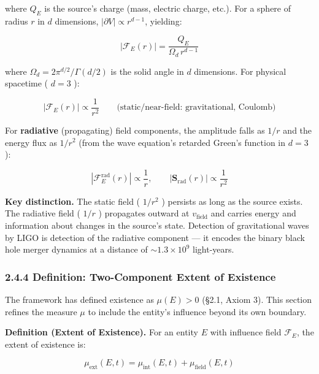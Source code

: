 \documentclass[11pt,a4paper]{article}
\theoremstyle{definition}\newtheorem{definition}{Definition}
\theoremstyle{remark}\newtheorem{remark}{Remark}
\begin{document}
where $Q_E$ is the source's charge (mass, electric charge, etc.). For a sphere of radius $r$ in $d$ dimensions, $|\partial V| \propto r^{d-1}$, yielding:


\begin{equation}
\boxed{|\mathcal{F}_E(r)| = \frac{Q_E}{\Omega_d \, r^{d-1}}}
\end{equation}


where $\Omega_d = 2\pi^{d/2}/\Gamma(d/2)$ is the solid angle in $d$ dimensions. For physical spacetime ( $d = 3$ ):


\begin{equation}
|\mathcal{F}_E(r)| \propto \frac{1}{r^2} \qquad \text{(static/near-field: gravitational, Coulomb)}
\end{equation}


For \textbf{radiative} (propagating) field components, the amplitude falls as $1/r$ and the energy flux as $1/r^2$ (from the wave equation's retarded Green's function in $d = 3$ ):


\begin{equation}
|\mathcal{F}_E^{\text{rad}}(r)| \propto \frac{1}{r}, \qquad |\mathbf{S}_{\text{rad}}(r)| \propto \frac{1}{r^2}
\end{equation}


\textbf{Key distinction.} The static field ( $1/r^2$ ) persists as long as the source exists. The radiative field ( $1/r$ ) propagates outward at $v_{\text{field}}$ and carries energy and information about changes in the source's state. Detection of gravitational waves by LIGO is detection of the radiative component — it encodes the binary black hole merger dynamics at a distance of $\sim 1.3 \times 10^9$ light-years.
\subsubsection{2.4.4 Definition: Two-Component Extent of Existence}

The framework has defined existence as $\mu(E) > 0$ (§2.1, Axiom 3). This section refines the measure $\mu$ to include the entity's influence beyond its own boundary.

\textbf{Definition (Extent of Existence).} For an entity $E$ with influence field $\mathcal{F}_E$, the extent of existence is:


\begin{equation}
\boxed{\mu_{\text{ext}}(E, t) = \mu_{\text{int}}(E, t) + \mu_{\text{field}}(E, t)}
\end{equation}
\end{document}
